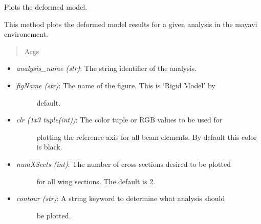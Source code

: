 \documentclass[letterpaper,10pt,english]{sphinxmanual}
\begin{document}
\begin{fulllineitems}
\begin{fulllineitems}
\end{fulllineitems}


\begin{fulllineitems}
\label{FEM:AeroComBAT.FEM.Model.plotDeformedModel}
Plots the deformed model.

This method plots the deformed model results for a given analysis in
the mayavi environement.
\begin{quote}\begin{description}
\item[{Args}] \leavevmode
\end{description}\end{quote}
\begin{itemize}
\item {} 
\emph{analysis\_name (str)}: The string identifier of the analysis.

\item {} \begin{description}
\item[{\emph{figName (str)}: The name of the figure. This is `Rigid Model' by}] \leavevmode
default.

\end{description}

\item {} \begin{description}
\item[{\emph{clr (1x3 tuple(int))}: The color tuple or RGB values to be used for}] \leavevmode
plotting the reference axis for all beam elements. By default this
color is black.

\end{description}

\item {} \begin{description}
\item[{\emph{numXSects (int)}: The number of cross-sections desired to be plotted}] \leavevmode
for all wing sections. The default is 2.

\end{description}

\item {} \begin{description}
\item[{\emph{contour (str)}: A string keyword to determine what analysis should}] \leavevmode
be plotted.


\end{description}
\end{itemize}
\end{fulllineitems}
\end{fulllineitems}
\end{document}
